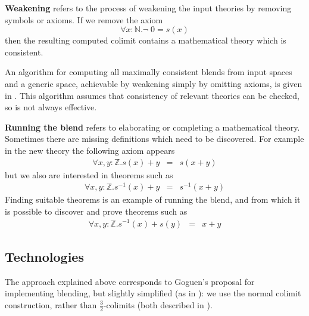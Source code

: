 {\bf Weakening} refers to the process of weakening the input
theories by removing symbols or axioms. If we remove the axiom 
$$
\forall x: \mathbb{N}. \neg\; 0 = s(x)
$$
then the resulting computed colimit contains a mathematical theory
which is consistent.  

An algorithm for computing all maximally consistent blends from input
spaces and a generic space, achievable by weakening simply by omitting
axioms, is given in \textcite{MartinezEtAl14}. This algorithm assumes
that consistency of relevant theories can be checked, so is not always
effective.

{\bf Running the blend} refers to elaborating or completing a
mathematical theory. Sometimes there are missing definitions which
need to be discovered. For example in the new theory 
the following axiom appears
\begin{eqnarray*}
\forall x,y:\mathbb{Z}. s(x) + y &=& s(x+y)
\end{eqnarray*}
but we also are interested in theorems such as
\begin{eqnarray*}
\forall x,y:\mathbb{Z}. s^{-1}(x) + y &=& s^{-1}(x+y)
\end{eqnarray*}
Finding suitable theorems is an example of running the blend, and from which it
is possible to discover and prove 
theorems such as
\begin{eqnarray*}
\forall x,y:\mathbb{Z}. s^{-1}(x) + s(y) &=& x+y
\end{eqnarray*}

\subsection{Technologies}

The approach explained above corresponds to Goguen's
proposal \parencite{Gog99} for implementing blending, but slightly
simplified %
(as in \textcite{KuMoNeCo14}): 
we use
the normal colimit construction, rather than $\frac{3}{2}$-colimits
(both described in \textcite{Gog99}).


